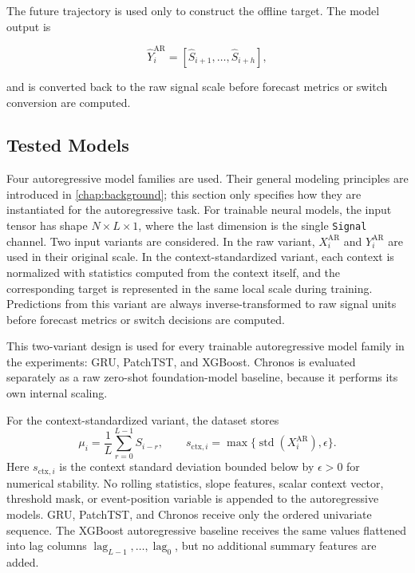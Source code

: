 The future trajectory is used only to construct the offline target. The model
output is

\[
  \widehat{Y}_i^{\text{AR}}
  =
  [\widehat{S}_{i+1}, \ldots, \widehat{S}_{i+h}],
\]

and is converted back to the raw signal scale before forecast metrics or switch
conversion are computed.

\subsection{Tested Models}

Four autoregressive model families are used. Their general modeling principles
are introduced in \cref{chap:background}; this section only specifies how they
are instantiated for the autoregressive task. For trainable neural models, the
input tensor has shape \(N\times L\times 1\), where the last dimension is the
single \texttt{Signal} channel. Two input variants are considered. In the raw
variant, \(X_i^{\text{AR}}\) and \(Y_i^{\text{AR}}\) are used in their original
scale. In the context-standardized variant, each context is normalized with
statistics computed from the context itself, and the corresponding target is
represented in the same local scale during training. Predictions from this
variant are always inverse-transformed to raw signal units before forecast
metrics or switch decisions are computed.

This two-variant design is used for every trainable autoregressive model family
in the experiments: GRU, PatchTST, and XGBoost. Chronos is evaluated separately
as a raw zero-shot foundation-model baseline, because it performs its own
internal scaling.

For the context-standardized variant, the dataset stores
\[
  \mu_i=\frac{1}{L}\sum_{r=0}^{L-1}S_{i-r},
  \qquad
  s_{\mathrm{ctx},i}=\max\{\operatorname{std}(X_i^{\text{AR}}),\epsilon\}.
\]
Here \(s_{\mathrm{ctx},i}\) is the context standard deviation bounded below by
\(\epsilon>0\) for numerical stability. No rolling statistics, slope features,
scalar context vector, threshold mask, or event-position variable is appended to
the autoregressive models. GRU, PatchTST, and Chronos receive only the ordered
univariate sequence. The XGBoost autoregressive baseline receives the same values
flattened into lag columns \(\operatorname{lag}_{L-1},\ldots,\operatorname{lag}_0\),
but no additional summary features are added.

